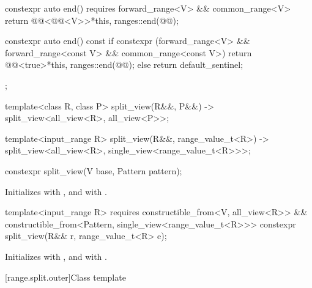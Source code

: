 \begin{codeblock}
{{    constexpr auto end() requires forward_range<V> && common_range<V> {
      return @@<@@<V>>{*this, ranges::end(@@)};
    }

    constexpr auto end() const {
      if constexpr (forward_range<V> && forward_range<const V> && common_range<const V>)
        return @@<true>{*this, ranges::end(@@)};
      else
        return default_sentinel;
    }
  };

  template<class R, class P>
    split_view(R&&, P&&) -> split_view<all_view<R>, all_view<P>>;

  template<input_range R>
    split_view(R&&, range_value_t<R>)
      -> split_view<all_view<R>, single_view<range_value_t<R>>>;
}
\end{codeblock}

%
\begin{itemdecl}
constexpr split_view(V base, Pattern pattern);
\end{itemdecl}

\begin{itemdescr}
\pnum
\effects
Initializes  with , and
 with .
\end{itemdescr}

%
\begin{itemdecl}
template<input_range R>
  requires constructible_from<V, all_view<R>> &&
           constructible_from<Pattern, single_view<range_value_t<R>>>
constexpr split_view(R&& r, range_value_t<R> e);
\end{itemdecl}

\begin{itemdescr}
\pnum
\effects
Initializes  with , and
 with .
\end{itemdescr}

[range.split.outer]{Class template }

